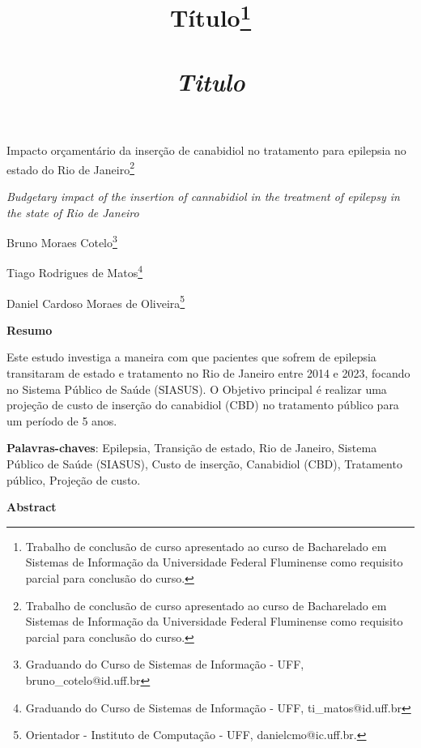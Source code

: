 \documentclass[article,a4paper,12pt,brazil,sumario=tradicional]{abntex2}
\title{ {\Large Título\footnote{Trabalho de conclusão de curso apresentado ao curso de Bacharelado em Sistemas de Informação da Universidade Federal Fluminense como requisito parcial para conclusão do curso.}\\\\
\vspace{.2} 
\textit{Titulo}\\}}
\date{ }
\begin{document}
\textual

\begin{center}
{\Large Impacto orçamentário da inserção de canabidiol no tratamento para epilepsia no estado do Rio de Janeiro\footnote{Trabalho de conclusão de curso apresentado ao curso de Bacharelado em Sistemas de Informação da Universidade Federal Fluminense como requisito parcial para conclusão do curso.}

\textit{Budgetary impact of the insertion of cannabidiol in the treatment of epilepsy in the state of Rio de Janeiro}\\}
\end{center}
\vspace{.2cm} 

\begin{flushright}
Bruno Moraes Cotelo\footnote{Graduando do Curso de Sistemas de Informação - UFF, bruno\_cotelo@id.uff.br}

Tiago Rodrigues de Matos\footnote{Graduando do Curso de Sistemas de Informação - UFF, ti\_matos@id.uff.br}

Daniel Cardoso Moraes de Oliveira\footnote{Orientador - Instituto de Computação - UFF, danielcmo@ic.uff.br.} 

\end{flushright}

\vspace{\onelineskip}

\begin{center}
    \textbf{Resumo}
\end{center}

\vspace{-.3cm}

\noindent Este estudo investiga a maneira com que pacientes que sofrem de epilepsia transitaram de estado e tratamento no Rio de Janeiro entre 2014 e 2023, focando no Sistema Público de Saúde (SIASUS). O Objetivo principal é realizar uma projeção de custo de inserção do canabidiol (CBD) no tratamento público para um período de 5 anos.

\vspace{.4cm}
 
\noindent
\textbf{Palavras-chaves}: Epilepsia, Transição de estado, Rio de Janeiro, Sistema Público de Saúde (SIASUS), Custo de inserção, Canabidiol (CBD), Tratamento público, Projeção de custo.
 
\vspace{\onelineskip}

\begin{center}
    \textbf{Abstract}
\end{center}
\end{document}
